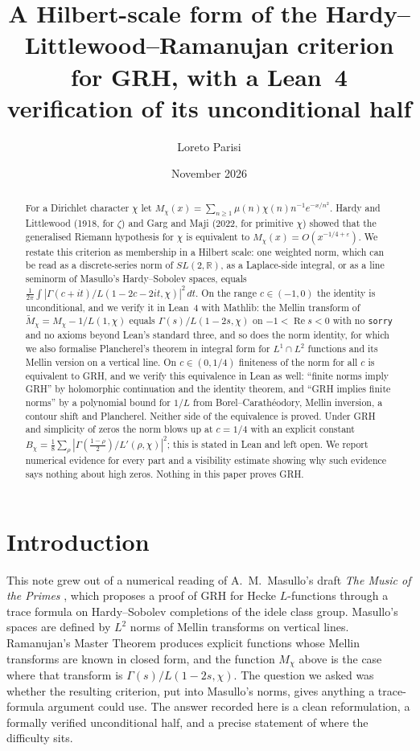 \documentclass[11pt]{amsart}
\title[A Hilbert-scale form of the Hardy--Littlewood--Ramanujan criterion]{A Hilbert-scale form of the
Hardy--Littlewood--Ramanujan criterion for GRH, with a Lean~4 verification of its unconditional half}
\author{Loreto Parisi}
\date{November 2026}
\theoremstyle{definition}
\theoremstyle{remark}
\newcommand{\Mt}{\widetilde{M}_\chi}
\newcommand{\R}{\mathbb{R}}
\renewcommand{\Re}{\operatorname{Re}}
\begin{document}
\begin{abstract}
For a Dirichlet character $\chi$ let $M_\chi(x)=\sum_{n\ge1}\mu(n)\chi(n)n^{-1}e^{-x/n^2}$. Hardy and
Littlewood (1918, for $\zeta$) and Garg and Maji (2022, for primitive $\chi$) showed that the generalised Riemann
hypothesis for $\chi$ is equivalent to $M_\chi(x)=O(x^{-1/4+\varepsilon})$. We restate this criterion as membership
in a Hilbert scale: one weighted norm, which can be read as a discrete-series norm of $SL(2,\R)$, as a Laplace-side
integral, or as a line seminorm of Masullo's Hardy--Sobolev spaces, equals $\frac1{2\pi}\int|\Gamma(c+it)/L(1-2c-2it,\chi)|^2\,dt$.
On the range $c\in(-1,0)$ the identity is unconditional, and we verify it in Lean~4 with Mathlib: the Mellin
transform of $\Mt=M_\chi-1/L(1,\chi)$ equals $\Gamma(s)/L(1-2s,\chi)$ on $-1<\Re s<0$ with no \texttt{sorry} and no
axioms beyond Lean's standard three, and so does the norm identity, for which we also formalise Plancherel's
theorem in integral form for $L^1\cap L^2$ functions and its Mellin version on a vertical line. On $c\in(0,1/4)$
finiteness of the norm for all $c$ is equivalent to GRH, and we verify this equivalence in Lean as well: ``finite
norms imply GRH'' by holomorphic continuation and the identity theorem, and ``GRH implies finite norms'' by a
polynomial bound for $1/L$ from Borel--Carath\'eodory, Mellin inversion, a contour shift and Plancherel. Neither side
of the equivalence is proved. Under GRH and simplicity of zeros the norm blows up at $c=1/4$ with an explicit constant
$B_\chi=\frac18\sum_\rho|\Gamma(\frac{1-\rho}2)/L'(\rho,\chi)|^2$; this is stated in Lean and left open. We report numerical evidence for every part and a visibility
estimate showing why such evidence says nothing about high zeros. Nothing in this paper proves GRH.
\end{abstract}

\maketitle

\section{Introduction}

This note grew out of a numerical reading of A.~M.~Masullo's draft \emph{The Music of the Primes} \cite{Masullo}, which
proposes a proof of GRH for Hecke $L$-functions through a trace formula on Hardy--Sobolev completions of the idele
class group. Masullo's spaces are defined by $L^2$ norms of Mellin transforms on vertical lines. Ramanujan's Master
Theorem produces explicit functions whose Mellin transforms are known in closed form, and the function $M_\chi$ above
is the case where that transform is $\Gamma(s)/L(1-2s,\chi)$. The question we asked was whether the resulting
criterion, put into Masullo's norms, gives anything a trace-formula argument could use. The answer recorded here is
a clean reformulation, a formally verified unconditional half, and a precise statement of where the difficulty sits.
\end{document}
